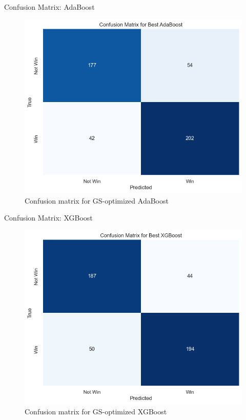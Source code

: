 \documentclass{beamer}
\begin{document}
\begin{frame}{Confusion Matrix: AdaBoost}
    \begin{figure}
        \centering
        \includegraphics[width=0.7\linewidth]{images/cm_adaboost.png}
        \caption{Confusion matrix for GS-optimized AdaBoost}
        \label{fig:enter-label}
    \end{figure}
\end{frame}

\begin{frame}{Confusion Matrix: XGBoost}
    \begin{figure}
        \centering
        \includegraphics[width=0.7\linewidth]{images/cm_xgboost.png}
        \caption{Confusion matrix for GS-optimized XGBoost}
        \label{fig:enter-label}
    \end{figure}
\end{frame}
\end{document}
